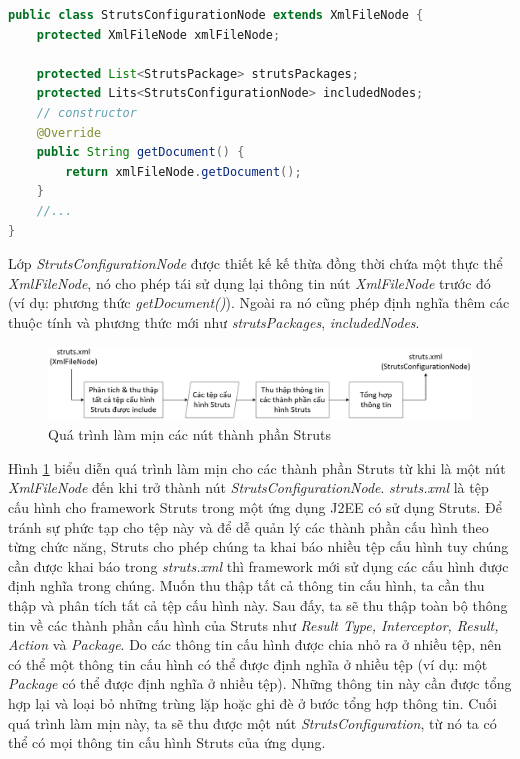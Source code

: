 \documentclass[12pt]{report}
\begin{document}
\begin{lstlisting}[language=Java,
caption={Ví dụ sử dụng mẫu thiết kế Decorator},label={code:decorator-dp}]
public class StrutsConfigurationNode extends XmlFileNode {
	protected XmlFileNode xmlFileNode;
	
	protected List<StrutsPackage> strutsPackages;
	protected Lits<StrutsConfigurationNode> includedNodes;
	// constructor
	@Override
	public String getDocument() {
		return xmlFileNode.getDocument();
	}
	//...
}
\end{lstlisting}

Lớp \textit{StrutsConfigurationNode} được thiết kế kế thừa đồng thời chứa một thực thể \textit{XmlFileNode}, nó cho phép tái sử dụng lại thông tin nút \textit{XmlFileNode} trước đó (ví dụ: phương thức \textit{getDocument()}). Ngoài ra nó cũng phép định nghĩa thêm các thuộc tính và phương thức mới như \textit{strutsPackages}, \textit{includedNodes}.

\begin{figure}[h]
	\centering
	\includegraphics[scale=0.5]{lam-min-process}
	\caption{Quá trình làm mịn các nút thành phần Struts}
	\label{fig:lam-min-process}
\end{figure}

Hình \ref{fig:lam-min-process} biểu diễn quá trình làm mịn cho các thành phần Struts từ khi là một nút \textit{XmlFileNode} đến khi trở thành nút \textit{StrutsConfigurationNode}. \textit{struts.xml} là tệp cấu hình cho framework Struts trong một ứng dụng J2EE có sử dụng Struts. Để tránh sự phức tạp cho tệp này và để dễ quản lý các thành phần cấu hình theo từng chức năng, Struts cho phép chúng ta khai báo nhiều tệp cấu hình tuy chúng cần được khai báo trong \textit{struts.xml} thì framework mới sử dụng các cấu hình được định nghĩa trong chúng. Muốn thu thập tất cả thông tin cấu hình, ta cần thu thập và phân tích tất cả tệp cấu hình này. Sau đấy, ta sẽ thu thập toàn bộ thông tin về các thành phần cấu hình của Struts như \textit{Result Type, Interceptor, Result, Action} và \textit{Package}. Do các thông tin cấu hình được chia nhỏ ra ở nhiều tệp, nên có thể một thông tin cấu hình có thể được định nghĩa ở nhiều tệp (ví dụ: một \textit{Package} có thể được định nghĩa ở nhiều tệp). Những thông tin này cần được tổng hợp lại và loại bỏ những trùng lặp hoặc ghi đè ở bước tổng hợp thông tin. Cuối quá trình làm mịn này, ta sẽ thu được một nút \textit{StrutsConfiguration}, từ nó ta có thể có mọi thông tin cấu hình Struts của ứng dụng.
\end{document}
